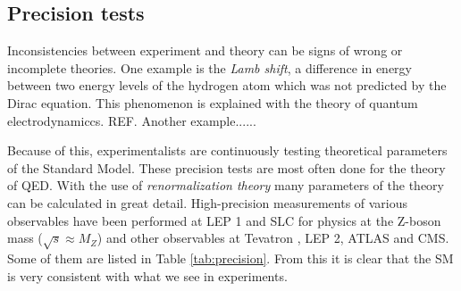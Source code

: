\subsection{Precision tests}
Inconsistencies between experiment and theory can be signs of wrong or incomplete theories. One example is the \textit{Lamb shift}, a difference in energy between two energy levels of the hydrogen atom which was not predicted by the Dirac equation. This phenomenon is explained with the theory of quantum electrodynamiccs. REF. Another example......

Because of this, experimentalists are continuously testing theoretical parameters of the Standard Model. These precision tests are most often done for the theory of QED. With the use of \textit{renormalization theory} many parameters of the theory can be calculated in great detail. High-precision measurements of various observables have been performed at LEP 1 and SLC \cite{ALEPH:2005ab,Riemann:2010zz,Abe:2000dq,Abe:2000uc,Abe:2000hk,Abe:1996ef} for physics at the Z-boson mass ($\sqrt{s} \approx M_Z$) and other observables at Tevatron \cite{Aaltonen:2013iut,TEW:2010aj}, LEP 2\cite{TEW:2010aj}, ATLAS\cite{Aaboud:2017svj,ATLASurl1} and CMS\cite{CMSurl1,CMSurl2}. Some of them are listed in Table \ref{tab:precision}. From this it is clear that the SM is very consistent with what we see in experiments.


